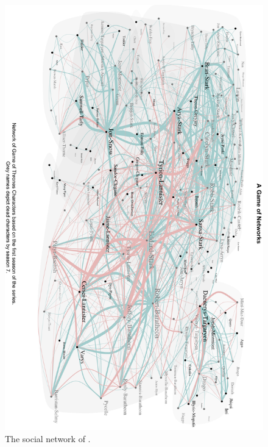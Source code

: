 \begin{figure}
    \centering
    \includegraphics[scale=0.4]{plots/GOTplot.png}
    \caption{The social network of \got.}
    \label{fig:GOTplot}
\end{figure}